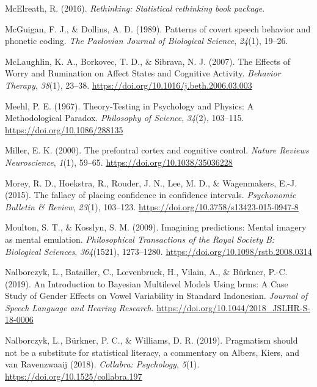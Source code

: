 \documentclass[a4paper,12pt,twoside,openright,oldfontcommands]{memoir}
\begin{document}
\hypertarget{ref-R-rethinking}{}
McElreath, R. (2016). \emph{Rethinking: Statistical rethinking book
package}.

\hypertarget{ref-mcguigan_patterns_1989}{}
McGuigan, F. J., \& Dollins, A. D. (1989). Patterns of covert speech
behavior and phonetic coding. \emph{The Pavlovian Journal of Biological
Science}, \emph{24}(1), 19--26.

\hypertarget{ref-mclaughlin_effects_2007}{}
McLaughlin, K. A., Borkovec, T. D., \& Sibrava, N. J. (2007). The
Effects of Worry and Rumination on Affect States and Cognitive Activity.
\emph{Behavior Therapy}, \emph{38}(1), 23--38.
\url{https://doi.org/10.1016/j.beth.2006.03.003}

\hypertarget{ref-meehl_theory-testing_1967}{}
Meehl, P. E. (1967). Theory-Testing in Psychology and Physics: A
Methodological Paradox. \emph{Philosophy of Science}, \emph{34}(2),
103--115. \url{https://doi.org/10.1086/288135}

\hypertarget{ref-miller_prefontral_2000}{}
Miller, E. K. (2000). The prefontral cortex and cognitive control.
\emph{Nature Reviews Neuroscience}, \emph{1}(1), 59--65.
\url{https://doi.org/10.1038/35036228}

\hypertarget{ref-morey_fallacy_2015}{}
Morey, R. D., Hoekstra, R., Rouder, J. N., Lee, M. D., \& Wagenmakers,
E.-J. (2015). The fallacy of placing confidence in confidence intervals.
\emph{Psychonomic Bulletin \& Review}, \emph{23}(1), 103--123.
\url{https://doi.org/10.3758/s13423-015-0947-8}

\hypertarget{ref-moulton_imagining_2009}{}
Moulton, S. T., \& Kosslyn, S. M. (2009). Imagining predictions: Mental
imagery as mental emulation. \emph{Philosophical Transactions of the
Royal Society B: Biological Sciences}, \emph{364}(1521), 1273--1280.
\url{https://doi.org/10.1098/rstb.2008.0314}

\hypertarget{ref-nalborczyk_introduction_2019}{}
Nalborczyk, L., Batailler, C., Lœvenbruck, H., Vilain, A., \& Bürkner,
P.-C. (2019). An Introduction to Bayesian Multilevel Models Using brms:
A Case Study of Gender Effects on Vowel Variability in Standard
Indonesian. \emph{Journal of Speech Language and Hearing Research}.
\url{https://doi.org/10.1044/2018_JSLHR-S-18-0006}

\hypertarget{ref-nalborczyk_pragmatism_2019}{}
Nalborczyk, L., Bürkner, P. C., \& Williams, D. R. (2019). Pragmatism
should not be a substitute for statistical literacy, a commentary on
Albers, Kiers, and van Ravenzwaaij (2018). \emph{Collabra: Psychology},
\emph{5}(1). \url{https://doi.org/10.1525/collabra.197}
\end{document}
